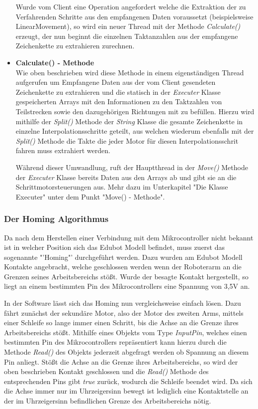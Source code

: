 \begin{itemize}
Wurde vom Client eine Operation angefordert welche die Extraktion der zu Verfahrenden Schritte aus den empfangenen Daten voraussetzt (beispielsweise LinearMovement), so wird ein neuer Thread mit der Methode \textit{Calculate()} erzeugt, der nun beginnt die einzelnen Taktanzahlen aus der empfangene Zeichenkette zu extrahieren zurechnen.

\item \textbf{Calculate() - Methode}\\
Wie oben beschrieben wird diese Methode in einem eigenständigen Thread aufgerufen um Empfangene Daten aus der vom Client gesendeten Zeichenkette zu extrahieren und die statisch in der \textit{Executer} Klasse gespeicherten Arrays mit den Informationen zu den Taktzahlen von Teilstrecken sowie den dazugehörigen Richtungen mit zu befüllen. 
Hierzu wird mithilfe der \textit{Split()} Methode der \textit{String} Klasse die gesamte Zeichenkette in einzelne Interpolationsschritte geteilt, aus welchen wiederum ebenfalls mit der \textit{Split()} Methode die Takte die jeder Motor für diesen Interpolationsschrit fahren muss extrahiert werden.

Während dieser Umwandlung, ruft der Hauptthread in der \textit{Move()} Methode der \textit{Executer} Klasse bereits Daten aus den Arrays ab und gibt sie an die Schrittmotorsteuerungen aus. Mehr dazu im Unterkapitel "Die Klasse Executer" unter dem Punkt "Move() - Methode".

\end{itemize}
\subsubsection{Der Homing Algorithmus}
Da nach dem Herstellen einer Verbindung mit dem Mikrocontroller nicht bekannt ist in welcher Position sich das Edubot Modell befindet, muss zuerst das sogenannte "'Homing"' durchgeführt werden. Dazu wurden am Edubot Modell Kontakte angebracht, welche geschlossen werden wenn der Roboterarm an die Grenzen seines Arbeitsbereichs stößt. Wurde der besagte Kontakt hergestellt, so liegt an einem bestimmten Pin des Mikrocontrollers eine Spannung von 3,5V an. 

In der Software lässt sich das Homing nun vergleichsweise einfach lösen. Dazu fährt zunächst der sekundäre Motor, also der Motor des zweiten Arms, mittels einer Schleife so lange immer einen Schritt, bis die Achse an die Grenze ihres Arbeitsbereichs stößt. Mithilfe eines Objekts vom Type \textit{InputPin}, welches einen bestimmten Pin des Mikrocontrollers repräsentiert kann hierzu durch die Methode \textit{Read()} des Objekts jederzeit abgefragt werden ob Spannung an diesem Pin anliegt. Stößt die Achse an die Grenze ihres Arbeitsbereichs, so wird der oben beschrieben Kontakt geschlossen und die \textit{Read()} Methode des entsprechenden Pins gibt \textit{true} zurück, wodurch die Schleife beendet wird. Da sich die Achse immer nur im Uhrzeigersinn bewegt ist lediglich eine Kontaktstelle an der im Uhrzeigersinn befindlichen Grenze des Arbeitsbereichs nötig. 

